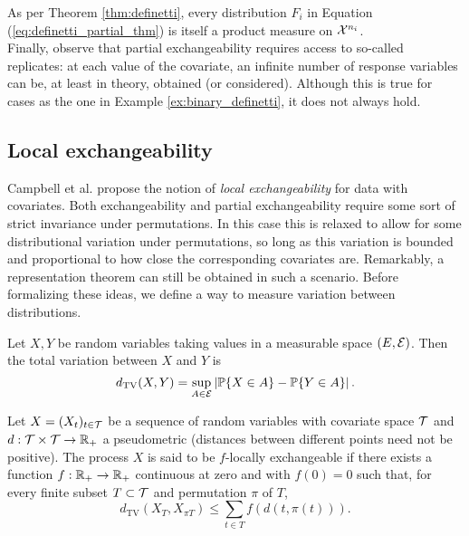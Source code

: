 As per Theorem \ref{thm:definetti}, every distribution $F_i$ in Equation (\ref{eq:definetti_partial_thm}) is itself a product measure on $\mathcal{X}^{n_i}$. \\


Finally, observe that partial exchangeability requires access to so-called replicates: at each value of the covariate, an infinite number of response variables can be, at least in theory, obtained (or considered). Although this is true for cases as the one in Example \ref{ex:binary_definetti}, it does not always hold.



\subsection{Local exchangeability}


Campbell et al. \cite{CampbellEtAl:2019:LocalExch} propose the notion of \textit{local exchangeability} for data with covariates. Both exchangeability and partial exchangeability require some sort of strict invariance under permutations. In this case this is relaxed to allow for some distributional variation under permutations, so long as this variation is bounded and proportional to how close the corresponding covariates are. Remarkably, a representation theorem can still be obtained in such a scenario. Before formalizing these ideas, we define a way to measure variation between distributions.


\begin{definition}
	Let $X, Y$ be random variables taking values in a measurable space $(E, \mathcal{E})$. Then the total variation between $X$ and $Y$ is
	\begin{equation*}
		d_{\mathrm{TV}} (X, Y) = \sup_{A \in \mathcal{E}} \left| \mathbb{P} \{ X \in A \} - \mathbb{P} \{Y \in A \} \right|.
	\end{equation*}
\end{definition}


\begin{definition} \label{def:local_exchangeability}
	Let $X = (X_t)_{t \in \mathcal{T}}$ be a sequence of random variables with covariate space $\mathcal{T}$ and $d: \mathcal{T} \times \mathcal{T} \to \mathbb{R}_{+}$ a pseudometric (distances between different points need not be positive). The process $X$ is said to be $f$-locally exchangeable if there exists a function $f: \mathbb{R}_{+} \to \mathbb{R}_{+}$ continuous at zero and with $f(0) = 0$ such that, for every finite subset $T \subset \mathcal{T}$ and permutation $\pi$ of $T$,
	\begin{equation} \label{eq:local_exch}
		d_{\mathrm{TV}} (X_T, X_{\pi T}) \leq \sum_{t \in T} f(d(t, \pi(t))).
	\end{equation}
\end{definition}


